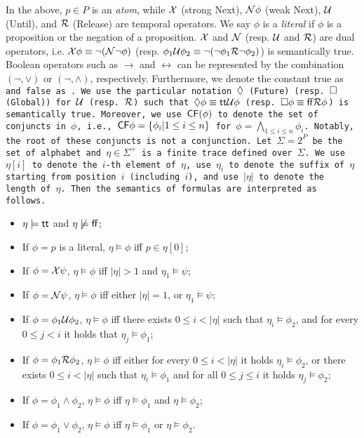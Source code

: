 In the above, $p \in P$ is an \emph{atom}, while $\X$ (strong Next), $\N \phi$ (weak Next), $\U$ (Until), and $\R$ (Release) are temporal operators. We say $\phi$ is a \emph{literal} if $\phi$ is a proposition or the negation of a proposition. $\X$ and $\N$ (resp. $\U$ and $\R$) are dual operators, i.e. $\X\phi\equiv \neg(\N\neg\phi)$ (resp. $\phi_1\U\phi_2 \equiv \neg (\neg\phi_1 \R\neg\phi_2)$) is semantically true. Boolean operators such as $\rightarrow$ and $\leftrightarrow$ can be represented by the combination $(\neg, \vee)$ or $(\neg, \wedge)$, respectively. Furthermore, we denote the constant \textsf{true} as \tt and \textsf{false} as \ff. We use the particular notation $\F$ (Future) (resp. $\G$ (Global)) for $\U$ (resp. $\R$) such that $\F\phi \equiv \tt\U\phi$ (resp. $\G\phi \equiv \ff \R\phi$) is semantically true. Moreover, we use $\cf(\phi)$ to denote the set of conjuncts in $\phi$, i.e., $\cf{\phi} = \{\phi_i | 1\leq i\leq n\}$ for $\phi = \bigwedge_{1\leq i\leq n}\phi_i$. Notably, the root of these conjuncts is not a conjunction. Let $\Sigma = 2^P$ be the set of alphabet and $\eta\in\Sigma^+$ is a finite trace defined over $\Sigma$. We use $\eta[i]$ to denote the $i$-th element of $\eta$, use $\eta_i$ to denote the suffix of $\eta$ starting from position $i$ (including $i$), and use $|\eta|$ to denote the length of $\eta$. Then the semantics of \ltlf formulas are interpreted as follows.
\begin{itemize}
\item  $\eta \models \tt$ and $\eta \not\models \ff$;
\item  If $\phi = p$ is a literal, $\eta \models \phi$ iff $p \in \eta[0]$;
\item  If $\phi = \X \psi$, $\eta \models \phi$ iff $|\eta|>1$ and $\eta_{1} \models \psi$;
\item  If $\phi = \N \psi$, $\eta \models \phi$ iff either $|\eta| = 1$, or $\eta_{1} \models \psi$;
\item  If $\phi = \phi_{1} \U \phi_{2}$, $\eta \models\phi$ iff there exists $0 \leq i<|\eta|$ such that $\eta_{i} \models \phi_{2}$, and for every $0 \leq j<i$ it holds that $\eta_{j} \models \phi_{1}$;
\item  If $\phi = \phi_{1} \R \phi_{2}$, $\eta \models \phi$ iff either for every $0 \leq i<|\eta|$ it holds $\eta_{i}\models \phi_{2}$, or there exists $0 \leq i<|\eta|$ such that $\eta_{i} \models \phi_{1}$ and for all $0 \leq j \leq i$ it holds $\eta_{j} \models \phi_{2}$;
\item  If $\phi = \phi_{1} \wedge \phi_{2}$, $\eta \models \phi$ iff $\eta \models \phi_{1}$ and $\eta \models \phi_{2}$;
\item  If $\phi=\phi_{1} \vee \phi_{2}$, $\eta \models \phi$ iff $\eta \models \phi_{1}$ or $\eta \models \phi_{2}$.
\end{itemize}

